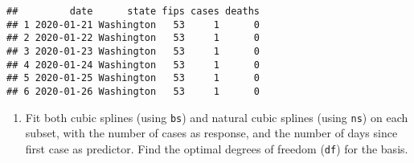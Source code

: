 \documentclass[]{article}
\newenvironment{Shaded}{\begin{snugshade}}{\end{snugshade}}
\newcommand{\CommentTok}[1]{\textcolor[rgb]{0.56,0.35,0.01}{\textit{#1}}}
\newcommand{\DataTypeTok}[1]{\textcolor[rgb]{0.13,0.29,0.53}{#1}}
\newcommand{\KeywordTok}[1]{\textcolor[rgb]{0.13,0.29,0.53}{\textbf{#1}}}
\newcommand{\NormalTok}[1]{#1}
\newcommand{\OperatorTok}[1]{\textcolor[rgb]{0.81,0.36,0.00}{\textbf{#1}}}
\newcommand{\StringTok}[1]{\textcolor[rgb]{0.31,0.60,0.02}{#1}}
\providecommand{\tightlist}{%
  \setlength{\itemsep}{0pt}\setlength{\parskip}{0pt}}
\begin{document}
\begin{verbatim}
##         date      state fips cases deaths
## 1 2020-01-21 Washington   53     1      0
## 2 2020-01-22 Washington   53     1      0
## 3 2020-01-23 Washington   53     1      0
## 4 2020-01-24 Washington   53     1      0
## 5 2020-01-25 Washington   53     1      0
## 6 2020-01-26 Washington   53     1      0
\end{verbatim}

\begin{enumerate}
\def\labelenumi{(\alph{enumi})}
\setcounter{enumi}{1}
\tightlist
\item
  Fit both cubic splines (using \texttt{bs}) and natural cubic splines
  (using \texttt{ns}) on each subset, with the number of cases as
  response, and the number of days since first case as predictor. Find
  the optimal degrees of freedom (\texttt{df}) for the basis.
\end{enumerate}

\begin{Shaded}
\end{Shaded}
\end{document}
